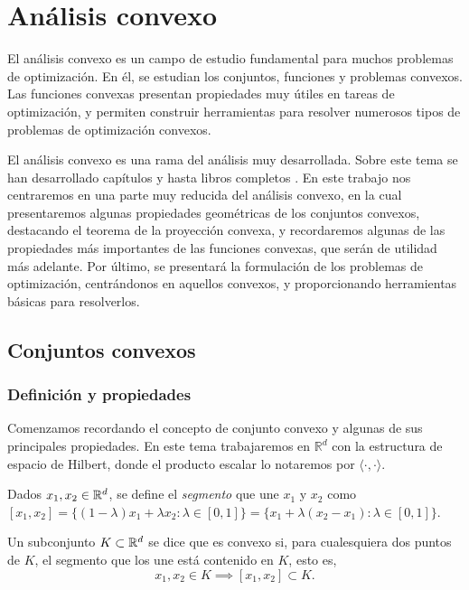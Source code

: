\chapter{Análisis convexo}

El análisis convexo es un campo de estudio fundamental para muchos problemas de optimización. En él, se estudian los conjuntos, funciones y problemas convexos. Las funciones convexas presentan propiedades muy útiles en tareas de optimización, y permiten construir herramientas para resolver numerosos tipos de problemas de optimización convexos.

El análisis convexo es una rama del análisis muy desarrollada. Sobre este tema se han desarrollado capítulos y hasta libros completos \cite{convexoptimization,convexanalysis,variations_convex}. En este trabajo nos centraremos en una parte muy reducida del análisis convexo, en la cual presentaremos algunas propiedades geométricas de los conjuntos convexos, destacando el teorema de la proyección convexa, y recordaremos algunas de las propiedades más importantes de las funciones convexas, que serán de utilidad más adelante. Por último, se presentará la formulación de los problemas de optimización, centrándonos en aquellos convexos, y proporcionando herramientas básicas para resolverlos.

\section{Conjuntos convexos}

\subsection{Definición y propiedades}

Comenzamos recordando el concepto de conjunto convexo y algunas de sus principales propiedades. En este tema trabajaremos en $\mathbb{R}^d$ con la estructura de espacio de Hilbert, donde el producto escalar lo notaremos por $\langle \cdot, \cdot \rangle$.

\begin{definition}
    Dados $x_1,x_2 \in \mathbb{R}^d$, se define el \emph{segmento} que une $x_1$ y $x_2$ como $[x_1,x_2] = \{ (1-\lambda) x_1 + \lambda x_2 \colon \lambda \in [0,1] \} = \{x_1 + \lambda(x_2-x_1) \colon \lambda \in [0,1] \}$.
\end{definition}

\begin{definition}
    Un subconjunto $K \subset \mathbb{R}^d$ se dice que es convexo si, para cualesquiera dos puntos de $K$, el segmento que los une está contenido en $K$, esto es,
    \[ x_1,x_2 \in K \implies [x_1,x_2] \subset K. \]
\end{definition}

